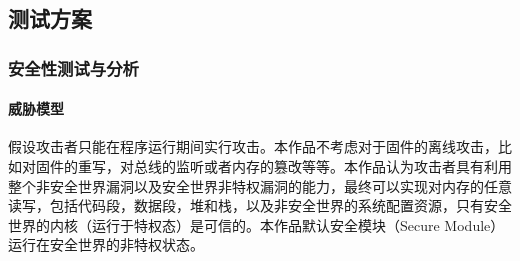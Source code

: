 \documentclass[UTF8,12pt,a4paper]{ctexart}
\numberwithin{figure}{section}
\begin{document}
\subsection{测试方案}
\subsubsection{安全性测试与分析}
\paragraph{威胁模型}
\par 假设攻击者只能在程序运行期间实行攻击。本作品不考虑对于固件的离线攻击，比如对固件的重写，对总线的监听或者内存的篡改等等。本作品认为攻击者具有利用整个非安全世界漏洞以及安全世界非特权漏洞的能力，最终可以实现对内存的任意读写，包括代码段，数据段，堆和栈，以及非安全世界的系统配置资源，只有安全世界的内核（运行于特权态）是可信的。本作品默认安全模块（Secure Module）运行在安全世界的非特权状态。
\end{document}
